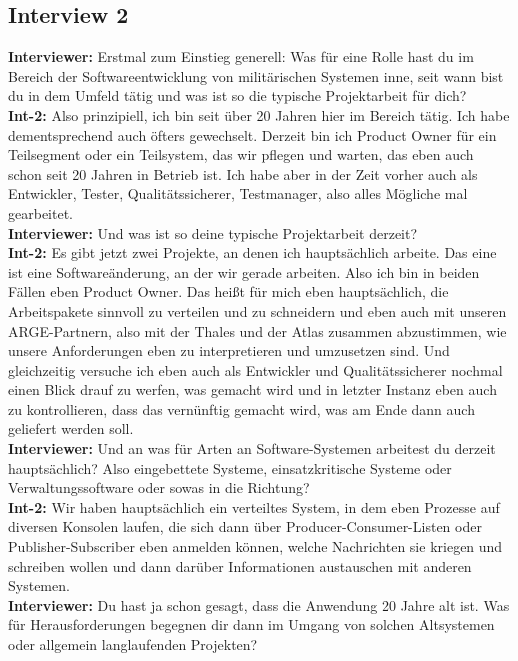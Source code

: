 \subsection*{Interview 2}
\textbf{Interviewer:} Erstmal zum Einstieg generell: Was für eine Rolle hast du im Bereich der Softwareentwicklung von militärischen Systemen inne, seit wann bist du in dem Umfeld tätig und was ist so die typische Projektarbeit für dich?\\
\textbf{Int-2:} Also prinzipiell, ich bin seit über 20 Jahren hier im Bereich tätig. Ich habe dementsprechend auch öfters gewechselt. Derzeit bin ich Product Owner für ein Teilsegment oder ein Teilsystem, das wir pflegen und warten, das eben auch schon seit 20 Jahren in Betrieb ist. Ich habe aber in der Zeit vorher auch als Entwickler, Tester, Qualitätssicherer, Testmanager, also alles Mögliche mal gearbeitet.\\
\textbf{Interviewer:} Und was ist so deine typische Projektarbeit derzeit?\\
\textbf{Int-2:} Es gibt jetzt zwei Projekte, an denen ich hauptsächlich arbeite. Das eine ist eine Softwareänderung, an der wir gerade arbeiten. Also ich bin in beiden Fällen eben Product Owner. Das heißt für mich eben hauptsächlich, die Arbeitspakete sinnvoll zu verteilen und zu schneidern und eben auch mit unseren ARGE-Partnern, also mit der Thales und der Atlas zusammen abzustimmen, wie unsere Anforderungen eben zu interpretieren und umzusetzen sind. Und gleichzeitig versuche ich eben auch als Entwickler und Qualitätssicherer nochmal einen Blick drauf zu werfen, was gemacht wird und in letzter Instanz eben auch zu kontrollieren, dass das vernünftig gemacht wird, was am Ende dann auch geliefert werden soll.\\
\textbf{Interviewer:} Und an was für Arten an Software-Systemen arbeitest du derzeit hauptsächlich? Also eingebettete Systeme, einsatzkritische Systeme oder Verwaltungssoftware oder sowas in die Richtung?\\
\textbf{Int-2:} Wir haben hauptsächlich ein verteiltes System, in dem eben Prozesse auf diversen Konsolen laufen, die sich dann über Producer-Consumer-Listen oder Publisher-Subscriber eben anmelden können, welche Nachrichten sie kriegen und schreiben wollen und dann darüber Informationen austauschen mit anderen Systemen. \\
\textbf{Interviewer:} Du hast ja schon gesagt, dass die Anwendung 20 Jahre alt ist. Was für Herausforderungen begegnen dir dann im Umgang von solchen Altsystemen oder allgemein langlaufenden Projekten?\\
